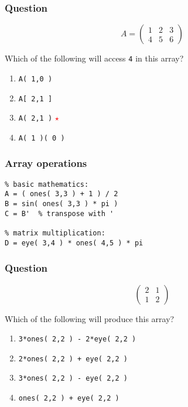 \documentclass[11pt]{beamer}
\newcommand{\correctstar}{{\Large\textcolor{red}{$\star$}}}
\begin{document}
\begin{frame}[fragile]
  \frametitle{Question}
  \Enlarge
$$
A =
\left(
\begin{array}{ccc}
1 & 2 & 3 \\
4 & 5 & 6
\end{array}
\right)
$$

Which of the following will access \texttt{4} in this array?

  \begin{enumerate}[label=\Alph*]
    \item  \texttt{A( 1,0 )}
    \item  \texttt{A[ 2,1 ]}
    \item  \texttt{A( 2,1 )} \correctstar
    \item  \texttt{A( 1 )( 0 )}
  \end{enumerate}
\end{frame}

\begin{frame}[fragile]
  \frametitle{Array operations}
  \Enlarge

  \begin{Verbatim}
% basic mathematics:
A = ( ones( 3,3 ) + 1 ) / 2
B = sin( ones( 3,3 ) * pi )
C = B'  % transpose with '

% matrix multiplication:
D = eye( 3,4 ) * ones( 4,5 ) * pi
  \end{Verbatim}
\end{frame}

\begin{frame}[fragile]
  \frametitle{Question}
  \Enlarge
$$
\left(
\begin{array}{cc}
2 & 1 \\
1 & 2
\end{array}
\right)
$$

Which of the following will produce this array?

  \begin{enumerate}[label=\Alph*]
    \item  \texttt{3*ones( 2,2 ) - 2*eye( 2,2 )}
    \item  \texttt{2*ones( 2,2 ) + eye( 2,2 )}
    \item  \texttt{3*ones( 2,2 ) - eye( 2,2 )}
    \item  \texttt{ones( 2,2 ) + eye( 2,2 )}
  \end{enumerate}
\end{frame}
\end{document}
